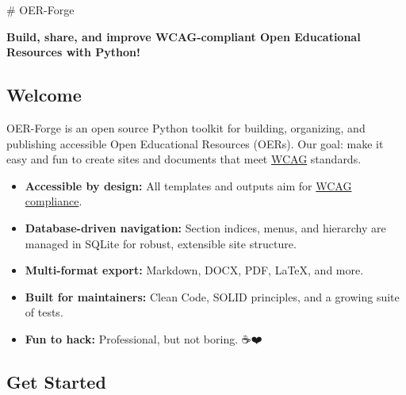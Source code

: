 \# OER-Forge

\textbf{Build, share, and improve WCAG-compliant Open Educational
Resources with Python!}

\subsection{Welcome}\label{welcome}

OER-Forge is an open source Python toolkit for building, organizing, and
publishing accessible Open Educational Resources (OERs). Our goal: make
it easy and fun to create sites and documents that meet
\href{https://www.w3.org/WAI/standards-guidelines/wcag/}{WCAG}
standards.

\begin{itemize}
\tightlist
\item
  \textbf{Accessible by design:} All templates and outputs aim for
  \href{https://www.w3.org/WAI/standards-guidelines/wcag/}{WCAG
  compliance}.
\item
  \textbf{Database-driven navigation:} Section indices, menus, and
  hierarchy are managed in SQLite for robust, extensible site structure.
\item
  \textbf{Multi-format export:} Markdown, DOCX, PDF, LaTeX, and more.
\item
  \textbf{Built for maintainers:} Clean Code, SOLID principles, and a
  growing suite of tests.
\item
  \textbf{Fun to hack:} Professional, but not boring. ☕️❤️
\end{itemize}

\subsection{Get Started}\label{get-started}

